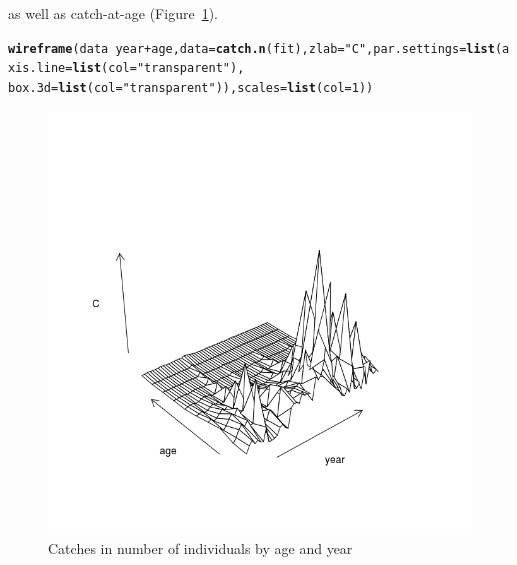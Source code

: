 \documentclass[a4paper,english,10pt]{article}\usepackage[]{graphicx}\usepackage[]{color}
\makeatletter
\def\maxwidth{ %
  \ifdim\Gin@nat@width>\linewidth
    \linewidth
  \else
    \Gin@nat@width
  \fi
}
\newcommand{\hlnum}[1]{\textcolor[rgb]{0.686,0.059,0.569}{#1}}%
\newcommand{\hlstr}[1]{\textcolor[rgb]{0.192,0.494,0.8}{#1}}%
\newcommand{\hlopt}[1]{\textcolor[rgb]{0,0,0}{#1}}%
\newcommand{\hlstd}[1]{\textcolor[rgb]{0.345,0.345,0.345}{#1}}%
\newcommand{\hlkwc}[1]{\textcolor[rgb]{0.333,0.667,0.333}{#1}}%
\newcommand{\hlkwd}[1]{\textcolor[rgb]{0.737,0.353,0.396}{\textbf{#1}}}%
\newenvironment{kframe}{%
 \def\at@end@of@kframe{}%
 \ifinner\ifhmode%
  \def\at@end@of@kframe{\end{minipage}}%
  \begin{minipage}{\columnwidth}%
 \fi\fi%
 \def\FrameCommand##1{\hskip\@totalleftmargin \hskip-\fboxsep
 \colorbox{shadecolor}{##1}\hskip-\fboxsep
     \hskip-\linewidth \hskip-\@totalleftmargin \hskip\columnwidth}%
 \MakeFramed {\advance\hsize-\width
   \@totalleftmargin\z@ \linewidth\hsize
   \@setminipage}}%
 {\par\unskip\endMakeFramed%
 \at@end@of@kframe}
\newenvironment{knitrout}{}{} %
\makeatother
\begin{document}
as well as catch-at-age (Figure~\ref{fig:C}).

\begin{knitrout}
\color{fgcolor}\begin{kframe}
\begin{alltt}
\hlkwd{wireframe}\hlstd{(data} \hlopt{~} \hlstd{year} \hlopt{+} \hlstd{age,} \hlkwc{data} \hlstd{=} \hlkwd{catch.n}\hlstd{(fit),} \hlkwc{zlab} \hlstd{=} \hlstr{"C"}\hlstd{,} \hlkwc{par.settings} \hlstd{=} \hlkwd{list}\hlstd{(}\hlkwc{axis.line} \hlstd{=} \hlkwd{list}\hlstd{(}\hlkwc{col} \hlstd{=} \hlstr{"transparent"}\hlstd{),}
    \hlkwc{box.3d} \hlstd{=} \hlkwd{list}\hlstd{(}\hlkwc{col} \hlstd{=} \hlstr{"transparent"}\hlstd{)),} \hlkwc{scales} \hlstd{=} \hlkwd{list}\hlstd{(}\hlkwc{col} \hlstd{=} \hlnum{1}\hlstd{))}
\end{alltt}
\end{kframe}\begin{figure}[H]

{\centering \includegraphics[width=\maxwidth]{figure/C-1} 

}

\caption[Catches in number of individuals by age and year]{Catches in number of individuals by age and year}\label{fig:C}
\end{figure}


\end{knitrout}
\end{document}
